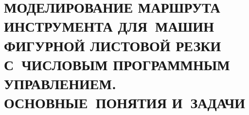 

\chapter{
  МОДЕЛИРОВАНИЕ МАРШРУТА ИНСТРУМЕНТА
  ДЛЯ~МАШИН ФИГУРНОЙ ЛИСТОВОЙ РЕЗКИ
  С~ЧИСЛОВЫМ ПРОГРАММНЫМ УПРАВЛЕНИЕМ.
  ОСНОВНЫЕ~ПОНЯТИЯ И~ЗАДАЧИ
}
\setcounter{chapter}{1}
\setcounter{equation}{0}





